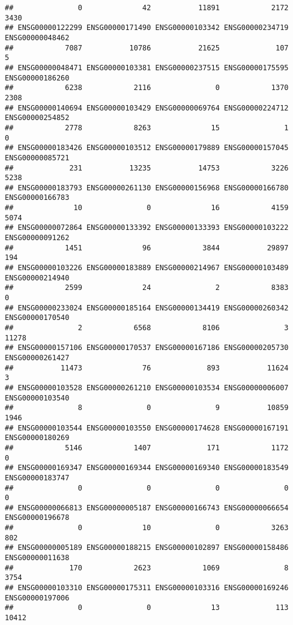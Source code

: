 \documentclass[
]{article}
\begin{document}
\begin{verbatim}
##               0              42           11891            2172            3430 
## ENSG00000122299 ENSG00000171490 ENSG00000103342 ENSG00000234719 ENSG00000048462 
##            7087           10786           21625             107               5 
## ENSG00000048471 ENSG00000103381 ENSG00000237515 ENSG00000175595 ENSG00000186260 
##            6238            2116               0            1370            2308 
## ENSG00000140694 ENSG00000103429 ENSG00000069764 ENSG00000224712 ENSG00000254852 
##            2778            8263              15               1               0 
## ENSG00000183426 ENSG00000103512 ENSG00000179889 ENSG00000157045 ENSG00000085721 
##             231           13235           14753            3226            5238 
## ENSG00000183793 ENSG00000261130 ENSG00000156968 ENSG00000166780 ENSG00000166783 
##              10               0              16            4159            5074 
## ENSG00000072864 ENSG00000133392 ENSG00000133393 ENSG00000103222 ENSG00000091262 
##            1451              96            3844           29897             194 
## ENSG00000103226 ENSG00000183889 ENSG00000214967 ENSG00000103489 ENSG00000214940 
##            2599              24               2            8383               0 
## ENSG00000233024 ENSG00000185164 ENSG00000134419 ENSG00000260342 ENSG00000170540 
##               2            6568            8106               3           11278 
## ENSG00000157106 ENSG00000170537 ENSG00000167186 ENSG00000205730 ENSG00000261427 
##           11473              76             893           11624               3 
## ENSG00000103528 ENSG00000261210 ENSG00000103534 ENSG00000006007 ENSG00000103540 
##               8               0               9           10859            1946 
## ENSG00000103544 ENSG00000103550 ENSG00000174628 ENSG00000167191 ENSG00000180269 
##            5146            1407             171            1172               0 
## ENSG00000169347 ENSG00000169344 ENSG00000169340 ENSG00000183549 ENSG00000183747 
##               0               0               0               0               0 
## ENSG00000066813 ENSG00000005187 ENSG00000166743 ENSG00000066654 ENSG00000196678 
##               0              10               0            3263             802 
## ENSG00000005189 ENSG00000188215 ENSG00000102897 ENSG00000158486 ENSG00000011638 
##             170            2623            1069               8            3754 
## ENSG00000103310 ENSG00000175311 ENSG00000103316 ENSG00000169246 ENSG00000197006 
##               0               0              13             113           10412 

\end{verbatim}
\end{document}
